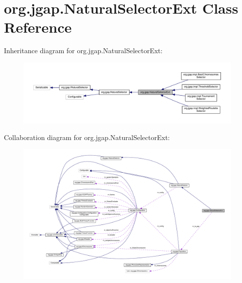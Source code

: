 \hypertarget{classorg_1_1jgap_1_1_natural_selector_ext}{\section{org.\-jgap.\-Natural\-Selector\-Ext Class Reference}
\label{classorg_1_1jgap_1_1_natural_selector_ext}
}


Inheritance diagram for org.\-jgap.\-Natural\-Selector\-Ext\-:
\nopagebreak
\begin{figure}[H]
\begin{center}
\leavevmode
\includegraphics[width=350pt]{classorg_1_1jgap_1_1_natural_selector_ext__inherit__graph}
\end{center}
\end{figure}


Collaboration diagram for org.\-jgap.\-Natural\-Selector\-Ext\-:
\nopagebreak
\begin{figure}[H]
\begin{center}
\leavevmode
\includegraphics[width=350pt]{classorg_1_1jgap_1_1_natural_selector_ext__coll__graph}
\end{center}
\end{figure}
